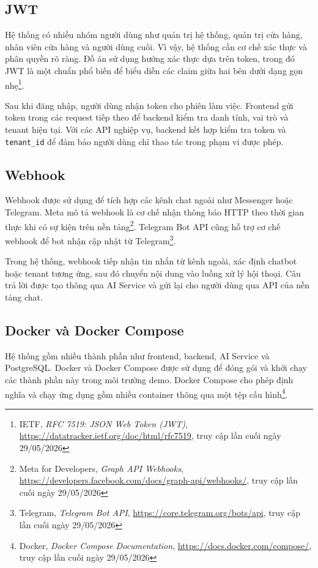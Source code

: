 \documentclass[../DoAn.tex]{subfiles}
\begin{document}
\subsection{JWT}
\label{subsection:3.2.6}

Hệ thống có nhiều nhóm người dùng như quản trị hệ thống, quản trị cửa hàng, nhân viên cửa hàng và người dùng cuối. Vì vậy, hệ thống cần cơ chế xác thực và phân quyền rõ ràng. Đồ án sử dụng hướng xác thực dựa trên token, trong đó JWT là một chuẩn phổ biến để biểu diễn các claim giữa hai bên dưới dạng gọn nhẹ\footnote{IETF, \textit{RFC 7519: JSON Web Token (JWT)}, \url{https://datatracker.ietf.org/doc/html/rfc7519}, truy cập lần cuối ngày 29/05/2026}.

Sau khi đăng nhập, người dùng nhận token cho phiên làm việc. Frontend gửi token trong các request tiếp theo để backend kiểm tra danh tính, vai trò và tenant hiện tại. Với các API nghiệp vụ, backend kết hợp kiểm tra token và \texttt{tenant\_id} để đảm bảo người dùng chỉ thao tác trong phạm vi được phép.

\subsection{Webhook}
\label{subsection:3.2.7}

Webhook được sử dụng để tích hợp các kênh chat ngoài như Messenger hoặc Telegram. Meta mô tả webhook là cơ chế nhận thông báo HTTP theo thời gian thực khi có sự kiện trên nền tảng\footnote{Meta for Developers, \textit{Graph API Webhooks}, \url{https://developers.facebook.com/docs/graph-api/webhooks/}, truy cập lần cuối ngày 29/05/2026}. Telegram Bot API cũng hỗ trợ cơ chế webhook để bot nhận cập nhật từ Telegram\footnote{Telegram, \textit{Telegram Bot API}, \url{https://core.telegram.org/bots/api}, truy cập lần cuối ngày 29/05/2026}.

Trong hệ thống, webhook tiếp nhận tin nhắn từ kênh ngoài, xác định chatbot hoặc tenant tương ứng, sau đó chuyển nội dung vào luồng xử lý hội thoại. Câu trả lời được tạo thông qua AI Service và gửi lại cho người dùng qua API của nền tảng chat.

\subsection{Docker và Docker Compose}
\label{subsection:3.2.8}

Hệ thống gồm nhiều thành phần như frontend, backend, AI Service và PostgreSQL. Docker và Docker Compose được sử dụng để đóng gói và khởi chạy các thành phần này trong môi trường demo. Docker Compose cho phép định nghĩa và chạy ứng dụng gồm nhiều container thông qua một tệp cấu hình\footnote{Docker, \textit{Docker Compose Documentation}, \url{https://docs.docker.com/compose/}, truy cập lần cuối ngày 29/05/2026}.
\end{document}
